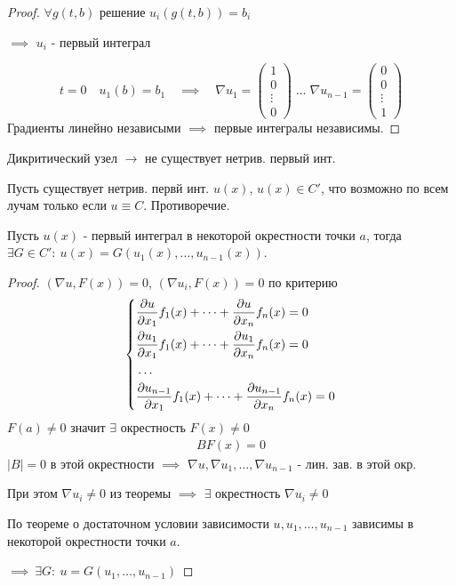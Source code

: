 \documentclass{article}
\begin{document}
\begin{proof}
  $\forall g(t,b)$ решение $u_i(g(t,b))=b_i$

  $\implies$ $u_i$ - первый интеграл

  \[
    t=0 \quad u_1(b)=b_1 \quad \implies \quad \nabla u_1=\begin{pmatrix}
      1 \\ 0 \\ \vdots \\ 0
      \end{pmatrix} \; \dots \; \nabla u_{n-1}=\begin{pmatrix}
      0 \\ 0 \\ \vdots \\ 1
    \end{pmatrix}
  \]
  Градиенты линейно независыми $\implies$ первые интегралы независимы.
\end{proof}
\begin{eg}
  Дикритический узел $\rightarrow$ не существует нетрив. первый инт.
  
  Пусть существует нетрив. первй инт. $u(x)$, $u(x)\in C'$, 
  что возможно по всем лучам только если $u \equiv C$.
  Противоречие.
\end{eg}
\begin{corollary}
  Пусть $u(x)$ - первый интеграл в некоторой окрестности точки $a$,
  тогда $\exists G \in C': \: u(x)=G(u_1(x),\dots ,u_{n-1}(x))$.
\end{corollary}
\begin{proof} 
  $(\nabla u, F(x))=0$, $(\nabla u_i, F(x))=0$ по критерию
  \begin{gather*}
    \left\{\begin{aligned}
      &\frac{\partial{u}}{\partial{x_1}}f_1(x) + \dots + \frac{\partial{u}}{\partial{x_n}}f_n(x)=0 \\ 
      &\frac{\partial{u_1}}{\partial{x_1}}f_1(x) + \dots + \frac{\partial{u_1}}{\partial{x_n}}f_n(x)=0 \\ 
      &\dots \\
      &\frac{\partial{u_{n-1}}}{\partial{x_1}}f_1(x) + \dots + \frac{\partial{u_{n-1}}}{\partial{x_n}}f_n(x)=0 \\ 
    \end{aligned}\right. \\
  \end{gather*}
  $F(a) \neq 0$ значит $\exists$ окрестность $F(x)\neq 0$ 
  \begin{gather*}
    BF(x)=0
  \end{gather*}
  $|B|=0$ в этой окрестности $\implies$ $\nabla u, \nabla u_1,\dots , \nabla u_{n-1}$
  - лин. зав. в этой окр.

  При этом $\nabla u_i \neq 0$ из теоремы $\implies$ $\exists$ окрестность $\nabla u_i \neq 0$

  По теореме о достаточном условии зависимости 
  $u, u_1, \dots , u_{n-1}$ зависимы в некоторой окрестности точки $a$.

  $\implies \ \exists G: \: u=G(u_1,\dots ,u_{n-1})$
\end{proof}
\end{document}
